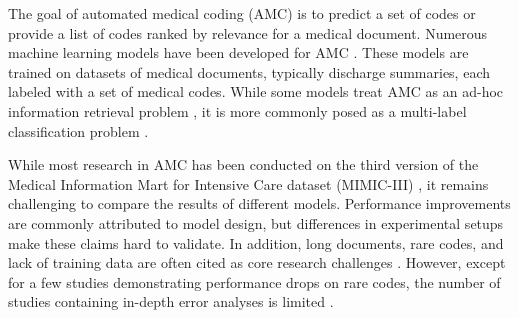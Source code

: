 \documentclass[anonymous=false, sigconf=true, review=false, natbib=true]{acmart}
\begin{document}
The goal of automated medical coding (AMC) is to predict a set of codes or provide a list of codes ranked by relevance for a medical document. Numerous machine learning models have been developed for AMC \cite{jiUnifiedReviewDeep2022, tengReviewDeepNeural2022, stanfillSystematicLiteratureReview2010}. These models are trained on datasets of medical documents, typically discharge summaries, each labeled with a set of medical codes.
While some models treat AMC as an ad-hoc information retrieval problem \cite{rizzoICDCodeRetrieval2015,parkInformationRetrievalApproach2019}, it is more commonly posed as a multi-label classification problem \cite{tengReviewDeepNeural2022, jiUnifiedReviewDeep2022}.

While most research in AMC has been conducted on the third version of the Medical Information Mart for Intensive Care dataset (MIMIC-III) \cite{tengReviewDeepNeural2022, venkateshAutomatingOverburdenedClinical2023}, it remains challenging to compare the results of different models. Performance improvements are commonly attributed to model design, but differences in experimental setups make these claims hard to validate.
In addition, long documents, rare codes, and lack of training data are often cited as core research challenges \cite{baoMedicalCodePrediction2021,dongAutomatedClinicalCoding2022,dongExplainableAutomatedCoding2021,feuchtDescriptionbasedLabelAttention2021,gaoLimitationsTransformersClinical2021,huangPLMICDAutomaticICD2022,jiDoesMagicBERT2021,jiUnifiedReviewDeep2022,kavuluruEmpiricalEvaluationSupervised2015,kimReadAttendCode2021,liICDCodingClinical2020,liuEffectiveConvolutionalAttention2021,michalopoulosICDBigBirdContextualEmbedding2022,moonsComparisonDeepLearning2020,pascualBERTbasedAutomaticICD2021,tengReviewDeepNeural2022,tengExplainablePredictionMedical2020,xieEHRCodingMultiscale2019,yangKnowledgeInjectedPrompt2022,zhangBERTXMLLargeScale2020,zhouAutomaticICDCoding2021, vuLabelAttentionModel2020, venkateshAutomatingOverburdenedClinical2023}. However, except for a few studies demonstrating performance drops on rare codes, the number of studies containing in-depth error analyses is limited \cite{baoMedicalCodePrediction2021,dongExplainableAutomatedCoding2021,jiDoesMagicBERT2021}.
\end{document}
